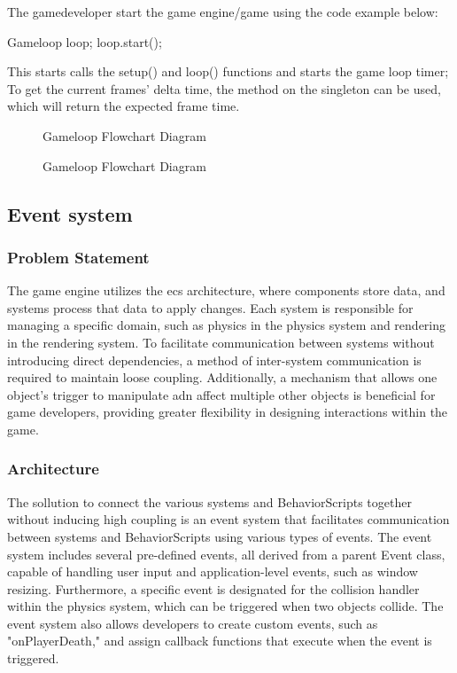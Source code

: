 \documentclass{projdoc}
\begin{document}
The gamedeveloper start the game engine/game using the code example below:\noparbreak
\begin{blockcode}
Gameloop loop;
loop.start();
\end{blockcode}

This starts calls the setup() and loop() functions and starts the game loop timer; To
get the current frames' delta time, the  method on the
 singleton can be used, which will return the expected frame
time.

\begin{figure}
	\centering
	\caption{Gameloop Flowchart Diagram}
	\label{fig:gameloop-flow}
\end{figure}

\begin{figure}
	\centering
	\caption{Gameloop Flowchart Diagram}
	\label{fig:gameloop-class}
\end{figure}

\subsection{Event system}

\subsubsection{Problem Statement}

The game engine utilizes the \gls{ecs} architecture, where components store data, and
systems process that data to apply changes. Each system is responsible for managing a
specific domain, such as physics in the physics system and rendering in the rendering
system. To facilitate communication between systems without introducing direct
dependencies, a method of inter-system communication is required to maintain loose
coupling. Additionally, a mechanism that allows one object's trigger to manipulate
adn affect multiple other objects is beneficial for game developers, providing
greater flexibility in designing interactions within the game.

\subsubsection{Architecture}

The sollution to connect the various systems and BehaviorScripts together without
inducing high coupling is an event system that facilitates communication between
systems and BehaviorScripts using various types of events. The event system includes
several pre-defined events, all derived from a parent Event class, capable of
handling user input and application-level events, such as window resizing.
Furthermore, a specific event is designated for the collision handler within the
physics system, which can be triggered when two objects collide. The event system
also allows developers to create custom events, such as "onPlayerDeath," and assign
callback functions that execute when the event is triggered.
\end{document}
